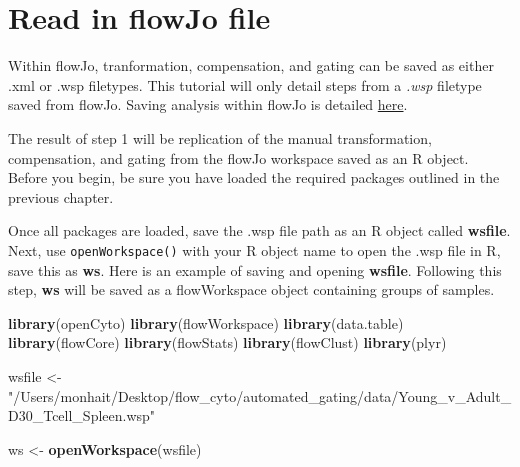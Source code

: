 \documentclass[]{book}
\newenvironment{Shaded}{\begin{snugshade}}{\end{snugshade}}
\newcommand{\KeywordTok}[1]{\textcolor[rgb]{0.13,0.29,0.53}{\textbf{#1}}}
\newcommand{\NormalTok}[1]{#1}
\newcommand{\StringTok}[1]{\textcolor[rgb]{0.31,0.60,0.02}{#1}}
\begin{document}
\hypertarget{read-in-flowjo-file}{%
\section{Read in flowJo file}\label{read-in-flowjo-file}}

Within flowJo, tranformation, compensation, and gating can be saved as either .xml or .wsp filetypes. This tutorial will only detail steps from a \emph{.wsp} filetype saved from flowJo. Saving analysis within flowJo is detailed \href{http://docs.flowjo.com/vx/workspaces-and-samples/ws-savinganalysis/}{here}.

The result of step 1 will be replication of the manual transformation, compensation, and gating from the flowJo workspace saved as an R object. Before you begin, be sure you have loaded the required packages outlined in the previous chapter.

Once all packages are loaded, save the .wsp file path as an R object called \textbf{wsfile}. Next, use \texttt{openWorkspace()} with your R object name to open the .wsp file in R, save this as \textbf{ws}. Here is an example of saving and opening \textbf{wsfile}. Following this step, \textbf{ws} will be saved as a flowWorkspace object containing groups of samples.

\begin{Shaded}
\begin{Highlighting}[]
\KeywordTok{library}\NormalTok{(openCyto)}
\KeywordTok{library}\NormalTok{(flowWorkspace)}
\KeywordTok{library}\NormalTok{(data.table)}
\KeywordTok{library}\NormalTok{(flowCore)}
\KeywordTok{library}\NormalTok{(flowStats)}
\KeywordTok{library}\NormalTok{(flowClust)}
\KeywordTok{library}\NormalTok{(plyr)}
\end{Highlighting}
\end{Shaded}

\begin{Shaded}
\begin{Highlighting}[]
\NormalTok{wsfile <-}\StringTok{ "/Users/monhait/Desktop/flow_cyto/automated_gating/data/Young_v_Adult_D30_Tcell_Spleen.wsp"}
\end{Highlighting}
\end{Shaded}

\begin{Shaded}
\begin{Highlighting}[]
\NormalTok{ws <-}\StringTok{ }\KeywordTok{openWorkspace}\NormalTok{(wsfile)}
\end{Highlighting}
\end{Shaded}
\end{document}

